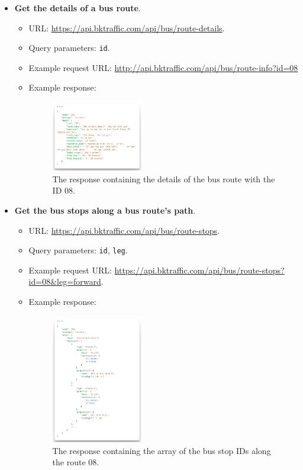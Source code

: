 \begin{itemize}
    \item \textbf{Get the details of a bus route}.
    \begin{itemize}
        \item URL: \url{https://api.bktraffic.com/api/bus/route-details}.
        \item Query parameters: \lstinline{id}.
        \item Example request URL: \url{http://api.bktraffic.com/api/bus/route-info?id=08}
        \item Example response:
        \begin{figure}[H]
            \centering
            \includegraphics[width=0.4\textwidth]{assets/images/Implementation/route_details_response.png}
            \caption{The response containing the details of the bus route with the ID 08.}
            \label{fig:route_details_response}
        \end{figure}
    \end{itemize}

    \item \textbf{Get the bus stops along a bus route's path}.
    \begin{itemize}
        \item URL: \url{https://api.bktraffic.com/api/bus/route-stops}.
        \item Query parameters: \lstinline{id}, \lstinline{leg}.
        \item Example request URL: \url{https://api.bktraffic.com/api/bus/route-stops?id=08&leg=forward}.
        \item Example response:
        \begin{figure}[H]
            \centering
            \includegraphics[width=0.4\textwidth]{assets/images/Implementation/route_stops_response.png}
            \caption{The response containing the array of the bus stop IDs along the route 08.}
            \label{fig:route_stops_response}
        \end{figure}
    \end{itemize}


\end{itemize}
